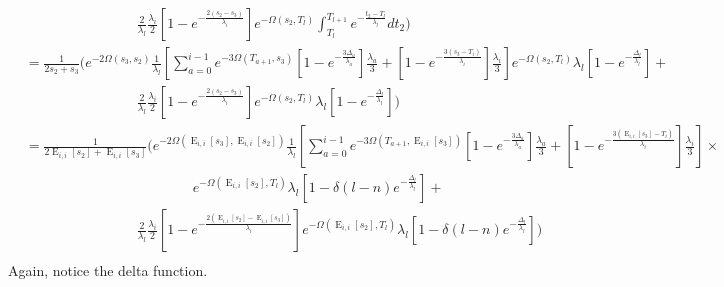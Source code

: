 \documentclass{article}
\DeclareMathOperator{\E}{E}
\begin{document}
\begin{align*}
    &\qquad\qquad\qquad\qquad
    \frac{2}{\lambda_l}\frac{\lambda_i}{2}\left[1-e^{-\frac{2(s_2-s_3)}{\lambda_i}}\right]
    e^{-\Omega(s_2,T_l)}\int_{T_l}^{T_{l+1}}e^{-\frac{t_2-T_l}{\lambda_l}}dt_2
    \Bigg)\\
    &=\frac{1}{2s_2+s_3}\Bigg(
    e^{-2\Omega(s_3,s_2)}\frac{1}{\lambda_l}\left[\sum_{a=0}^{i-1} e^{-3\Omega(T_{a+1},s_3)}
    \left[1-e^{-\frac{3 \Delta_a}{\lambda_a}}\right]\frac{\lambda_a}{3}+
    \left[1-e^{-\frac{3 \left(s_3-T_{i}\right)}{\lambda_{i}}}\right]\frac{\lambda_{i}}{3}\right]
    e^{-\Omega(s_2,T_l)}\lambda_l\left[1-e^{-\frac{\Delta_l}{\lambda_l}}\right]+\\
    &\qquad\qquad\qquad\qquad
    \frac{2}{\lambda_l}\frac{\lambda_i}{2}\left[1-e^{-\frac{2(s_2-s_3)}{\lambda_i}}\right]
    e^{-\Omega(s_2,T_l)}\lambda_l\left[1-e^{-\frac{\Delta_l}{\lambda_l}}\right]
    \Bigg)\\
    &=\frac{1}{2\E_{i,i}[s_2]+\E_{i,i}[s_3]}\Bigg(
    e^{-2\Omega(\E_{i,i}[s_3],\E_{i,i}[s_2])}\frac{1}{\lambda_l}\left[\sum_{a=0}^{i-1} e^{-3\Omega(T_{a+1},\E_{i,i}[s_3])}
    \left[1-e^{-\frac{3 \Delta_a}{\lambda_a}}\right]\frac{\lambda_a}{3}+
    \left[1-e^{-\frac{3 \left(\E_{i,i}[s_3]-T_{i}\right)}{\lambda_{i}}}\right]\frac{\lambda_{i}}{3}\right]\times\\
    &\qquad\qquad\qquad\qquad\qquad\qquad
    e^{-\Omega(\E_{i,i}[s_2],T_l)}\lambda_l\left[1-\delta(l-n)e^{-\frac{\Delta_l}{\lambda_l}}\right]+\\
    &\qquad\qquad\qquad\qquad
    \frac{2}{\lambda_l}\frac{\lambda_i}{2}\left[1-e^{-\frac{2(\E_{i,i}[s_2]-\E_{i,i}[s_3])}{\lambda_i}}\right]
    e^{-\Omega(\E_{i,i}[s_2],T_l)}\lambda_l\left[1-\delta(l-n)e^{-\frac{\Delta_l}{\lambda_l}}\right]
    \Bigg)\\
\end{align*}
Again, notice the delta function.
\end{document}
